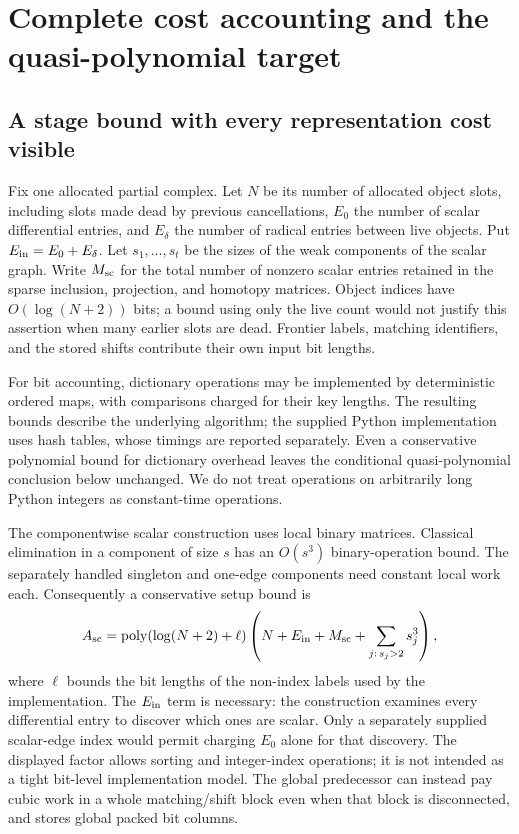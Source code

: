 \section{Complete cost accounting and the quasi-polynomial target}
\label{sec:accounting}

\subsection{A stage bound with every representation cost visible}

Fix one allocated partial complex. Let $N$ be its number of allocated
object slots, including slots made dead by previous cancellations,
$E_0$ the number of scalar differential entries, and $E_\delta$ the
number of radical entries between live objects. Put
$E_{\rm in}=E_0+E_\delta$. Let $s_1,\ldots,s_t$ be the sizes of the
weak components of the scalar graph. Write $M_{\rm sc}$ for the total
number of nonzero scalar entries retained in the sparse inclusion,
projection, and homotopy matrices. Object indices have
$O(\log(N+2))$ bits; a bound using only the live count would not
justify this assertion when many earlier slots are dead. Frontier
labels, matching identifiers, and the stored shifts contribute their
own input bit lengths.

For bit accounting, dictionary operations may be implemented by
deterministic ordered maps, with comparisons charged for their key
lengths. The resulting bounds describe the underlying algorithm;
the supplied Python implementation uses hash tables, whose timings
are reported separately. Even a conservative polynomial bound for
dictionary overhead leaves the conditional quasi-polynomial
conclusion below unchanged. We do not treat operations on arbitrarily
long Python integers as constant-time operations.

The componentwise scalar construction uses local binary matrices.
Classical elimination in a component of size $s$ has an
$O(s^3)$ binary-operation bound. The separately handled singleton and
one-edge components need constant local work each. Consequently a
conservative setup bound is
\begin{equation}
 A_{\rm sc}=
 \operatorname{poly}(\log(N+2)+\ell)\left(
 N+E_{\rm in}+M_{\rm sc}+\sum_{j:\,s_j>2}s_j^3\right),
 \label{eq:scalar-local-cost}
\end{equation}
where $\ell$ bounds the bit lengths of the non-index labels used by the
implementation. The $E_{\rm in}$ term is necessary: the construction
examines every differential entry to discover which ones are scalar.
Only a separately supplied scalar-edge index would permit charging
$E_0$ alone for that discovery. The displayed factor allows sorting
and integer-index operations; it is not intended as a
tight bit-level implementation model. The global predecessor can
instead pay cubic work in a whole matching/shift block even when that
block is disconnected, and stores global packed bit columns.

